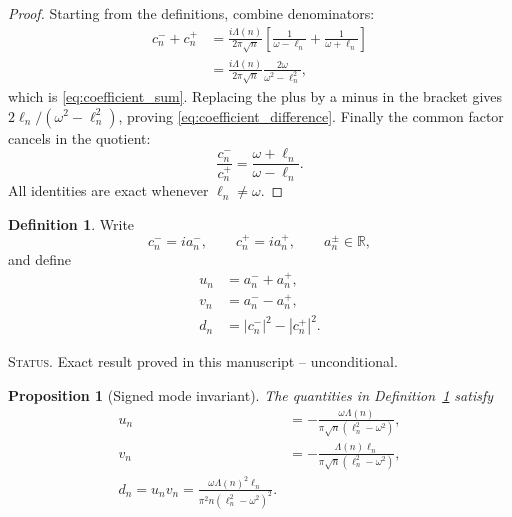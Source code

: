 \documentclass[11pt]{amsart}
\numberwithin{equation}{section}
\theoremstyle{plain}
\newtheorem{proposition}[theorem]{Proposition}
\theoremstyle{definition}
\newtheorem{definition}[theorem]{Definition}
\theoremstyle{remark}
\newcommand{\1}{\mathbf{1}}
\newcommand{\statusnote}[1]{%
  \par\smallskip\noindent
  \begingroup\footnotesize\textsc{Status.} #1\endgroup
  \par\smallskip}
\begin{document}
\begin{proof}
Starting from the definitions, combine denominators:
\begin{align}
c_n^-+c_n^+
&=
\frac{i\Lambda(n)}{2\pi\sqrt n}
\left[
\frac1{\omega-\ell_n}+\frac1{\omega+\ell_n}
\right]
\label{eq:coefficient_sum_proof_one}
\\
&=
\frac{i\Lambda(n)}{2\pi\sqrt n}
\frac{2\omega}{\omega^2-\ell_n^2},
\label{eq:coefficient_sum_proof_two}
\end{align}
which is \eqref{eq:coefficient_sum}.  Replacing the plus by a minus in
the bracket gives \(2\ell_n/(\omega^2-\ell_n^2)\), proving
\eqref{eq:coefficient_difference}.  Finally the common factor cancels in
the quotient:
\begin{equation}
\frac{c_n^-}{c_n^+}
=
\frac{\omega+\ell_n}{\omega-\ell_n}.
\label{eq:coefficient_ratio_proof}
\end{equation}
All identities are exact whenever \(\ell_n\neq\omega\).
\end{proof}

\begin{definition}
\label{def:u_v_d}
Write
\begin{equation}
c_n^-=ia_n^-,
\qquad
c_n^+=ia_n^+,
\qquad
a_n^\pm\in\mathbb R,
\label{eq:a_pm_definition}
\end{equation}
and define
\begin{align}
u_n
&=
a_n^-+a_n^+,
\label{eq:un_definition}
\\
v_n
&=
a_n^--a_n^+,
\label{eq:vn_definition}
\\
d_n
&=
|c_n^-|^2-|c_n^+|^2.
\label{eq:dn_definition}
\end{align}
\end{definition}

\statusnote{Exact result proved in this manuscript -- unconditional.}
\begin{proposition}[Signed mode invariant]
\label{prop:signed_mode_invariant}
The quantities in Definition~\ref{def:u_v_d} satisfy
\begin{align}
u_n
&=
-\frac{\omega\Lambda(n)}
{\pi\sqrt n(\ell_n^2-\omega^2)},
\label{eq:un_formula}
\\
v_n
&=
-\frac{\Lambda(n)\ell_n}
{\pi\sqrt n(\ell_n^2-\omega^2)},
\label{eq:vn_formula}
\\
\boxed{
d_n=u_nv_n
=
\frac{\omega\Lambda(n)^2\ell_n}
{\pi^2n(\ell_n^2-\omega^2)^2}.
}
\label{eq:dn_formula}
\end{align}
\end{proposition}
\end{document}
